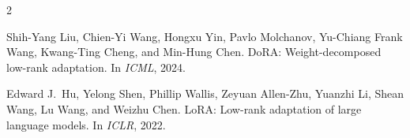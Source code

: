 \documentclass[11pt]{article}
\begin{document}

\begin{thebibliography}{2}

Shih-Yang Liu, Chien-Yi Wang, Hongxu Yin, Pavlo Molchanov, Yu-Chiang Frank Wang, Kwang-Ting Cheng, and Min-Hung Chen.
\newblock DoRA: Weight-decomposed low-rank adaptation.
\newblock In \textit{ICML}, 2024.

Edward J.\ Hu, Yelong Shen, Phillip Wallis, Zeyuan Allen-Zhu, Yuanzhi Li, Shean Wang, Lu Wang, and Weizhu Chen.
\newblock LoRA: Low-rank adaptation of large language models.
\newblock In \textit{ICLR}, 2022.

\end{thebibliography}
\end{document}
